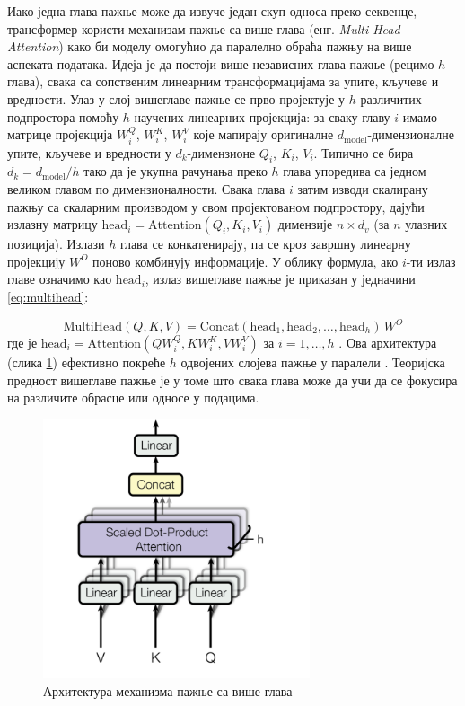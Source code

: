 Иако једна глава пажње може да извуче један скуп односа преко секвенце, трансформер користи механизам пажње са више глава (енг. \textit{Multi-Head Attention}) како би моделу омогућио да паралелно обраћа пажњу на више аспеката података. Идеја је да постоји више независних глава пажње (рецимо $h$ глава), свака са сопственим линеарним трансформацијама за упите, кључеве и вредности. Улаз у слој вишеглаве пажње се прво пројектује у $h$ различитих подпростора помоћу $h$ научених линеарних пројекција: за сваку главу $i$ имамо матрице пројекција $W_i^Q$, $W_i^K$, $W_i^V$ које мапирају оригиналне $d_{\text{model}}$-димензионалне упите, кључеве и вредности у $d_k$-димензионе $Q_i$, $K_i$, $V_i$. Типично се бира $d_k = d_{\text{model}}/h$ тако да је укупна рачунања преко $h$ глава упоредива са једном великом главом по димензионалности. Свака глава $i$ затим изводи скалирану пажњу са скаларним производом у свом пројектованом подпростору, дајући излазну матрицу $\text{head}_i = \text{Attention}(Q_i, K_i, V_i)$ димензије $n \times d_v$ (за $n$ улазних позиција). Излази $h$ глава се конкатенирају, па се кроз завршну линеарну пројекцију $W^O$ поново комбинују информације. У облику формула, ако $i$-ти излаз главе означимо као $\text{head}_i$, излаз вишеглаве пажње је приказан у једначини \ref{eq:multihead}:
\newline

\begin{equation}
\text{MultiHead}(Q, K, V) = \text{Concat}(\text{head}_1, \text{head}_2, \dots, \text{head}_h)\,W^O
\label{eq:multihead}
\end{equation}
\newline
\newline
где је $\text{head}_i = \text{Attention}(Q W_i^Q, K W_i^K, V W_i^V)$ за $i=1,\dots,h$ \cite{vaswani_attention_2017}. Ова архитектура (слика \ref{fig:multi_head_attention}) ефективно покреће $h$ одвојених слојева пажње у паралели \cite{vaswani_attention_2017}. Теоријска предност вишеглаве пажње је у томе што свака глава може да учи да се фокусира на различите обрасце или односе у подацима.

\begin{figure}[h]
    \centering
    \includegraphics[width=0.7\textwidth]{images/multi-head-attention.png}
    \caption{Архитектура механизма пажње са више глава}
    \label{fig:multi_head_attention}
\end{figure}

